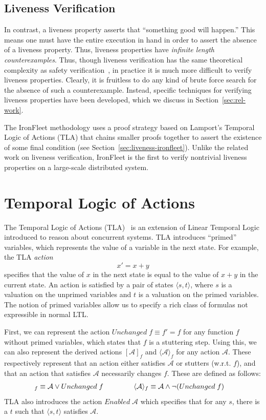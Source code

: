 \documentclass{llncs}
\begin{document}
\subsection{Liveness Verification}\label{sec:liveness-description}
In contrast, a liveness property asserts that ``something good will happen.''
This means one must have the entire execution in hand in order to assert the
absence of a liveness property. Thus, liveness properties have \textit{infinite
  length counterexamples}.  Thus, though liveness verification has the same
theoretical complexity as safety verification~\cite{simulation-liveness}, in
practice it is much more difficult to verify liveness properties. Clearly, it is
fruitless to do any kind of brute force search for the absence of such a
counterexample. Instead, specific techniques for verifying liveness properties
have been developed, which we discuss in Section~\ref{sec:rel-work}.

The IronFleet methodology uses a proof strategy based on Lamport's Temporal
Logic of Actions (TLA) that chains smaller proofs together to assert the
existence of some final condition (see
Section~\ref{sec:liveness-ironfleet}). Unlike the related work on liveness
verification, IronFleet is the first to verify nontrivial liveness properties on
a large-scale distributed system.
%

\section{Temporal Logic of Actions}\label{sec:tla}
The Temporal Logic of Actions (TLA)~\cite{tla-lamport} is an extension of Linear Temporal
Logic introduced to reason about concurrent systems. TLA introduces ``primed''
variables, which represents the value of a variable in the next state. For
example, the TLA \textit{action} $$x' = x + y$$ specifies that the value of $x$
in the next state is equal to the value of $x + y$ in the current state. An
action is satisfied by a pair of states $\langle s, t \rangle$, where $s$ is a
valuation on the unprimed variables and $t$ is a valuation on the primed
variables. The notion of primed variables allow us to specify a rich class of
formulas not expressible in normal LTL.

First, we can represent the action $Unchanged\;f \equiv f' = f$ for any 
function $f$  without primed variables, which states that $f$ is a
stuttering step. Using this, we can also represent the derived actions
$[\mathcal A]_f$ and $\langle \mathcal A \rangle_f$ for any action
$\mathcal A$. These respectively represent that an action either satisfies $\mathcal A$ or
stutters (w.r.t. $f$), and that an action that satisfies $\mathcal A$
necessarily changes $f$. These are defined as follows:
\begin{align*}
  [\mathcal A]_f \equiv \mathcal A \vee Unchanged\;f \hspace{1.5cm}
  & \langle \mathcal A \rangle_f \equiv \mathcal A \wedge \neg(Unchanged\;f)
\end{align*}
TLA also introduces the action $Enabled\;\mathcal A$ which specifies that for
any $s$, there is a $t$ such that $\langle s, t \rangle$ satisfies $\mathcal A$.
\end{document}
